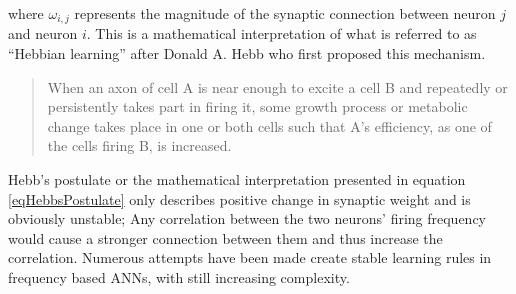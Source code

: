 	where $\omega_{i,j}$ represents the magnitude of the synaptic connection between neuron $j$ and neuron $i$.
	This is a mathematical interpretation of what is referred to as ``Hebbian learning'' after Donald A. Hebb who first proposed this mechanism.
\begin{quote}
	When an axon of cell A is near enough to excite a cell B and repeatedly or persistently takes part in firing it, some growth process or metabolic change takes place in one or both cells such that A’s efficiency, as one of the cells firing B, is increased. \cite{Hebb1949Kap4}
\end{quote}

	Hebb's postulate or the mathematical interpretation presented in equation \eqref{eqHebbsPostulate} only
		describes positive change in synaptic weight and is obviously unstable;
	Any correlation between the two neurons' firing frequency would cause a stronger connection between them and thus increase the correlation.
	Numerous attempts have been made create stable learning rules in frequency based ANNs, with still increasing complexity\cite{CITE, MASSE, MEIR, EndaFleir - EnTil}. %


